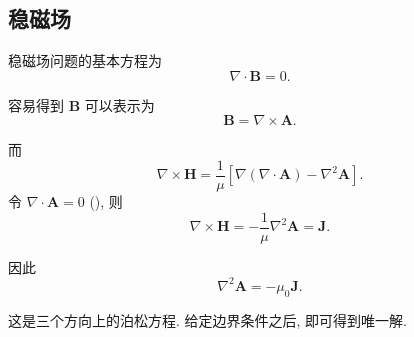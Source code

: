 \subsection{稳磁场}
稳磁场问题的基本方程为
\begin{equation}
    \nabla\cdot\bm{B}=0.
\end{equation}

容易得到 $\bm{B}$ 可以表示为
\begin{equation}
    \bm{B}=\nabla\times\bm{A}.
\end{equation}

而
\begin{equation}
    \nabla\times\bm{H}=\frac{1}{\mu}[\nabla(\nabla\cdot\bm{A})-\nabla^2\bm{A}].
\end{equation}
令 $\nabla\cdot\bm{A}=0$ {\color{blue} (\question[为什么可以如此假设?])}, 则
\begin{equation}
    \nabla\times\bm{H}=-\frac{1}{\mu}\nabla^2\bm{A}=\bm{J}.
\end{equation}

因此
\begin{equation}
    \nabla^2\bm{A}=-\mu_0\bm{J}.
\end{equation}

这是三个方向上的泊松方程. 给定边界条件之后, 即可得到唯一解.
